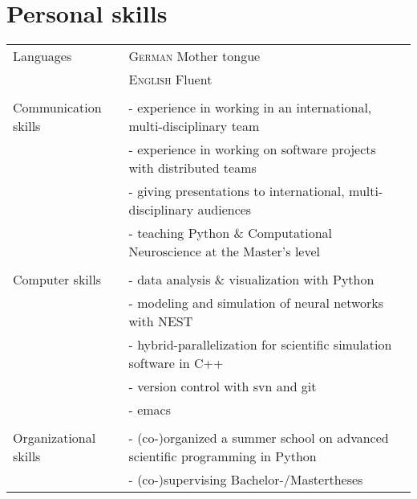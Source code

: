 \documentclass[a4paper,10pt]{article}
\begin{document}
\section{Personal skills}

\begin{tabular}{>{\hfill}p{3.3cm}|p{10.4cm}}
Languages & \textsc{German} Mother tongue \\
& \textsc{English} Fluent \\
  \multicolumn{2}{c}{} \\
Communication skills & - experience in working in an international, multi-disciplinary team \\
& - experience in working on software projects with distributed teams \\
& - giving presentations to international, multi-disciplinary audiences \\
& - teaching Python \& Computational Neuroscience at the Master's level \\
  \multicolumn{2}{c}{} \\
Computer skills & - data analysis \& visualization with Python \\
& - modeling and simulation of neural networks with NEST \\
& - hybrid-parallelization for scientific simulation software in C++ \\
& - version control with svn and git \\
& - emacs \\
  \multicolumn{2}{c}{} \\
Organizational skills & - (co-)organized a summer school on advanced scientific programming in Python \\
& - (co-)supervising Bachelor-/Mastertheses
\end{tabular}
\end{document}
